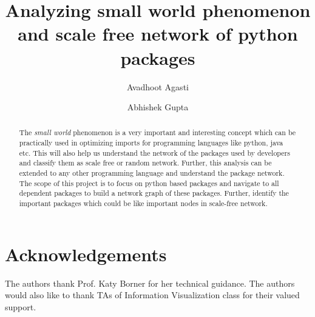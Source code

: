 \documentclass[sigconf]{acmart}
\begin{document}
\title{Analyzing small world phenomenon and scale free network of python packages}

\author{Avadhoot Agasti}

\author{Abhishek Gupta}

\begin{abstract}

The \textit{small world} phenomenon is a very important and interesting concept which can be practically 
used in optimizing imports for programming languages like python, java etc. This will also help us understand
the network of the packages used by developers and classify them as scale free or random network. Further,
this analysis can be extended to any other programming language and understand the package network. The 
scope of this project is to focus on python based packages and navigate to all dependent packages to build
a network graph of these packages. Further, identify the important packages which could be like important
nodes in scale-free network.   
\end{abstract}



\maketitle



















\section{Acknowledgements}
 The authors thank Prof. Katy Borner for her technical guidance. The
 authors would also like to thank TAs of Information Visualization class for their valued
 support.



\end{document}
